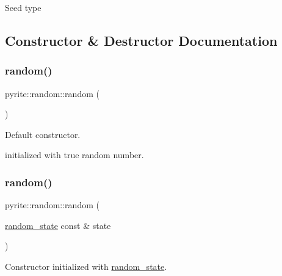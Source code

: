 Seed type 

\subsection{Constructor \& Destructor Documentation}
\mbox{\label{classpyrite_1_1random_ac3e5e10f4dd1474afe856780ba8d71e3}} 
\subsubsection{\texorpdfstring{random()}{random()}\hspace{0.1cm}{\footnotesize\ttfamily [1/5]}}
{\footnotesize\ttfamily pyrite\+::random\+::random (\begin{DoxyParamCaption}{ }\end{DoxyParamCaption})}

Default constructor.

initialized with true random number. \mbox{\label{classpyrite_1_1random_a593c1826bad1b27d489ee55c85da30b3}} 
\subsubsection{\texorpdfstring{random()}{random()}\hspace{0.1cm}{\footnotesize\ttfamily [2/5]}}
{\footnotesize\ttfamily pyrite\+::random\+::random (\begin{DoxyParamCaption}\item[{\mbox{\hyperlink{structpyrite_1_1random__state}{random\+\_\+state}} const \&}]{state }\end{DoxyParamCaption})\hspace{0.3cm}{\ttfamily [explicit]}}

Constructor initialized with \mbox{\hyperlink{structpyrite_1_1random__state}{random\+\_\+state}}.


